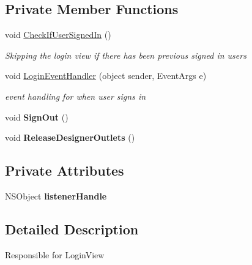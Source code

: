 \subsection*{Private Member Functions}
\begin{DoxyCompactItemize}
\item 
void \hyperlink{class_ramboell_1_1i_o_s_1_1_login_view_controller_a178185c28863ebd8a7918135534c508b}{Check\+If\+User\+Signed\+In} ()
\begin{DoxyCompactList}\small\item\em Skipping the login view if there has been previous signed in users \end{DoxyCompactList}\item 
void \hyperlink{class_ramboell_1_1i_o_s_1_1_login_view_controller_ab6b1b3b1ad0cc52e134869455ee8cad8}{Login\+Event\+Handler} (object sender, Event\+Args e)
\begin{DoxyCompactList}\small\item\em event handling for when user signs in \end{DoxyCompactList}\item 
\mbox{\label{class_ramboell_1_1i_o_s_1_1_login_view_controller_a2239a327cc26eda697b424d7c4d61969}} 
void {\bfseries Sign\+Out} ()
\item 
\mbox{\label{class_ramboell_1_1i_o_s_1_1_login_view_controller_add77014f1a30a9945553f070031962d1}} 
void {\bfseries Release\+Designer\+Outlets} ()
\end{DoxyCompactItemize}
\subsection*{Private Attributes}
\begin{DoxyCompactItemize}
\item 
\mbox{\label{class_ramboell_1_1i_o_s_1_1_login_view_controller_a03751734002cccf6d064f71790b6fae1}} 
N\+S\+Object {\bfseries listener\+Handle}
\end{DoxyCompactItemize}


\subsection{Detailed Description}
Responsible for Login\+View 



